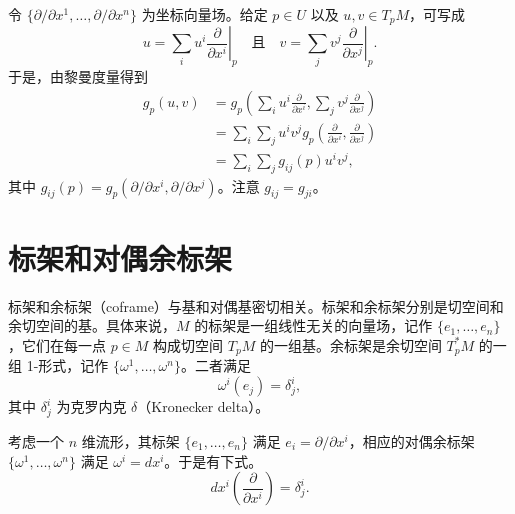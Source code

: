 令 $\{\partial/\partial x^1,\ldots,\partial/\partial x^n\}$ 为坐标向量场。给定 $p\in U$ 以及 $u,v\in T_pM$，可写成
\begin{equation*}
  u=\sum_i u^i \left.\frac{\partial}{\partial x^i}\right|_p
  \quad\text{且}\quad
  v=\sum_j v^j \left.\frac{\partial}{\partial x^j}\right|_p.
  \tag{2.3}\label{eq:2.3}
\end{equation*}
于是，由黎曼度量得到
\begin{equation*}
  \begin{aligned}
    g_p(u,v)
    &=g_p\!\left(\sum_i u^i\frac{\partial}{\partial x^i},
                \sum_j v^j\frac{\partial}{\partial x^j}\right)\\
    &=\sum_i\sum_j u^iv^j
      g_p\!\left(\frac{\partial}{\partial x^i},\frac{\partial}{\partial x^j}\right)\\
    &=\sum_i\sum_j g_{ij}(p)u^iv^j,
  \end{aligned}
  \tag{2.4}\label{eq:2.4}
\end{equation*}
其中 $g_{ij}(p)=g_p(\partial/\partial x^i,\partial/\partial x^j)$。注意 $g_{ij}=g_{ji}$。

\section{标架和对偶余标架}
标架和余标架（coframe）与基和对偶基密切相关。标架和余标架分别是切空间和余切空间的基。具体来说，$M$ 的标架是一组线性无关的向量场，记作 $\{e_1,\ldots,e_n\}$，它们在每一点 $p\in M$ 构成切空间 $T_pM$ 的一组基。余标架是余切空间 $T_p^*M$ 的一组 1-形式，记作 $\{\omega^1,\ldots,\omega^n\}$。二者满足
\begin{equation*}
  \omega^i(e_j)=\delta_j^i,
  \tag{2.5}\label{eq:2.5}
\end{equation*}
其中 $\delta_j^i$ 为克罗内克 $\delta$（Kronecker delta）。

考虑一个 $n$ 维流形，其标架 $\{e_1,\ldots,e_n\}$ 满足 $e_i=\partial/\partial x^i$，相应的对偶余标架 $\{\omega^1,\ldots,\omega^n\}$ 满足 $\omega^i=dx^i$。于是有下式。
\begin{equation*}
  dx^i\!\left(\frac{\partial}{\partial x^i}\right)=\delta_j^i.
  \tag{2.6}\label{eq:2.6}
\end{equation*}

